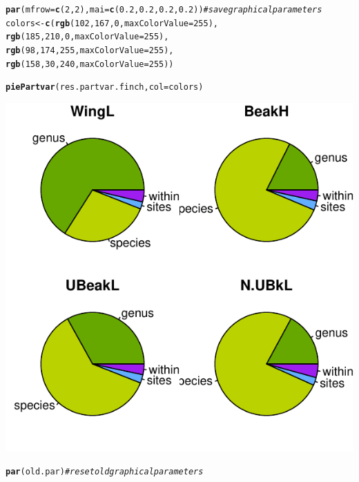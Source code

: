 \documentclass[12pt]{article}\usepackage[]{graphicx}\usepackage[]{color}
\makeatletter
\def\maxwidth{ %
  \ifdim\Gin@nat@width>\linewidth
    \linewidth
  \else
    \Gin@nat@width
  \fi
}
\newcommand{\hlnum}[1]{\textcolor[rgb]{0.686,0.059,0.569}{#1}}%
\newcommand{\hlcom}[1]{\textcolor[rgb]{0.678,0.584,0.686}{\textit{#1}}}%
\newcommand{\hlstd}[1]{\textcolor[rgb]{0.345,0.345,0.345}{#1}}%
\newcommand{\hlkwb}[1]{\textcolor[rgb]{0.69,0.353,0.396}{#1}}%
\newcommand{\hlkwc}[1]{\textcolor[rgb]{0.333,0.667,0.333}{#1}}%
\newcommand{\hlkwd}[1]{\textcolor[rgb]{0.737,0.353,0.396}{\textbf{#1}}}%
\newenvironment{kframe}{%
 \def\at@end@of@kframe{}%
 \ifinner\ifhmode%
  \def\at@end@of@kframe{\end{minipage}}%
  \begin{minipage}{\columnwidth}%
 \fi\fi%
 \def\FrameCommand##1{\hskip\@totalleftmargin \hskip-\fboxsep
 \colorbox{shadecolor}{##1}\hskip-\fboxsep
     \hskip-\linewidth \hskip-\@totalleftmargin \hskip\columnwidth}%
 \MakeFramed {\advance\hsize-\width
   \@totalleftmargin\z@ \linewidth\hsize
   \@setminipage}}%
 {\par\unskip\endMakeFramed%
 \at@end@of@kframe}
\newenvironment{knitrout}{}{} %
\makeatother
\begin{document}
\begin{knitrout}
\color{fgcolor}\begin{kframe}
\begin{alltt}
\hlkwd{par}\hlstd{(}\hlkwc{mfrow} \hlstd{=} \hlkwd{c}\hlstd{(}\hlnum{2}\hlstd{,}\hlnum{2}\hlstd{),} \hlkwc{mai} \hlstd{=} \hlkwd{c}\hlstd{(}\hlnum{0.2}\hlstd{,}\hlnum{0.2}\hlstd{,}\hlnum{0.2}\hlstd{,}\hlnum{0.2}\hlstd{))} \hlcom{#save graphical parameters}
\hlstd{colors}\hlkwb{<-}\hlkwd{c}\hlstd{(}\hlkwd{rgb}\hlstd{(}\hlnum{102}\hlstd{,}\hlnum{167}\hlstd{,}\hlnum{0}\hlstd{,} \hlkwc{maxColorValue} \hlstd{=} \hlnum{255}\hlstd{),}
     \hlkwd{rgb}\hlstd{(}\hlnum{185}\hlstd{,}\hlnum{210}\hlstd{,}\hlnum{0}\hlstd{,} \hlkwc{maxColorValue} \hlstd{=} \hlnum{255}\hlstd{),}
     \hlkwd{rgb}\hlstd{(}\hlnum{98}\hlstd{,}\hlnum{174}\hlstd{,}\hlnum{255}\hlstd{,} \hlkwc{maxColorValue} \hlstd{=} \hlnum{255}\hlstd{),}
     \hlkwd{rgb}\hlstd{(}\hlnum{158}\hlstd{,}\hlnum{30}\hlstd{,}\hlnum{240}\hlstd{,} \hlkwc{maxColorValue} \hlstd{=} \hlnum{255}\hlstd{))}

\hlkwd{piePartvar}\hlstd{(res.partvar.finch,} \hlkwc{col} \hlstd{= colors)}
\end{alltt}
\end{kframe}

{\centering \includegraphics[width=\maxwidth]{figure/unnamed-chunk-25} 

}


\begin{kframe}\begin{alltt}
\hlkwd{par}\hlstd{(old.par)} \hlcom{#reset old graphical parameters}
\end{alltt}
\end{kframe}
\end{knitrout}
\end{document}
